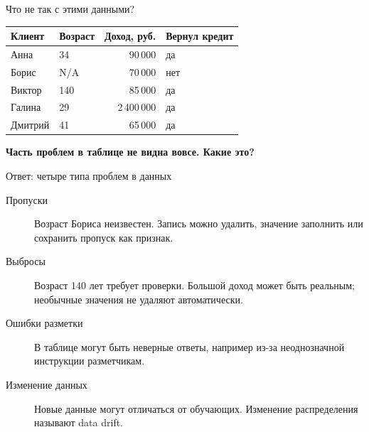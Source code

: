 \begin{frame}[c]{Что не так с этими данными?}

  \medskip
  \large
  \renewcommand{\arraystretch}{1.7}\setlength{\tabcolsep}{12pt}
  \begin{tabular}{llrl}
    \toprule
    \textbf{Клиент} & \textbf{Возраст} & \textbf{Доход, руб.} & \textbf{Вернул кредит}\\
    \midrule
    Анна    & 34  & 90\,000    & да\\
    Борис   & N/A & 70\,000    & нет\\
    Виктор  & 140 & 85\,000    & да\\
    Галина  & 29  & 2\,400\,000 & да\\
    Дмитрий & 41  & 65\,000    & да\\
    \bottomrule
  \end{tabular}

  \bigskip
  \textbf{Часть проблем в таблице не видна вовсе. Какие это?}
\end{frame}

\begin{frame}{Ответ: четыре типа проблем в данных}
  \begin{description}
    \item[Пропуски] Возраст Бориса неизвестен. Запись можно удалить,
      значение заполнить или сохранить пропуск как признак.
    \item[Выбросы] Возраст 140 лет требует проверки.
      Большой доход может быть реальным; необычные значения не удаляют автоматически.
    \item[Ошибки разметки] В таблице могут быть неверные ответы,
      например из-за неоднозначной инструкции разметчикам.
    \item[Изменение данных] Новые данные могут отличаться от обучающих.
      Изменение распределения называют data drift.
  \end{description}
\end{frame}
